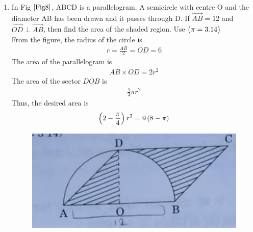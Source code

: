 \documentclass[journal,12pt,twocolumn]{IEEEtran}
\begin{document}
\begin{enumerate}[label=3.\arabic*]
    \item In Fig $\ref{Fig8}$, ABCD is a parallelogram. A semicircle with centre O and the diameter AB has been drawn and it passes through D. If $\Vec{AB} = 12$ and $\Vec{OD} \perp \Vec{AB}$, then find the area of the shaded region. Use $\begin{pmatrix}\pi = 3.14\end{pmatrix}$\\
	    \solution From the figure, the radius of the circle is  
	    \begin{align}
		    r = \frac{AB}{2} = OD = 6
	    \end{align}
	    The area of the parallelogram is 
	    \begin{align}
		    AB \times OD = 2r^2 
	    \end{align}
	    The area of the sector $DOB$ is 
	    \begin{align}
		    \frac{1}{4}\pi r^2 
	    \end{align}
	    Thus, the desired area is 
	    \begin{align}
		    \left(2 -  \frac{\pi}{4}\right) r^2 = 9\left(8 - \pi\right)
	    \end{align}
    \begin{figure}[h!]
        \centering
        \includegraphics[width=0.5\columnwidth]{Fig8.png}
    	\caption{}
    	\label{Fig8}
     \end{figure} 
\end{enumerate}
\end{document}
